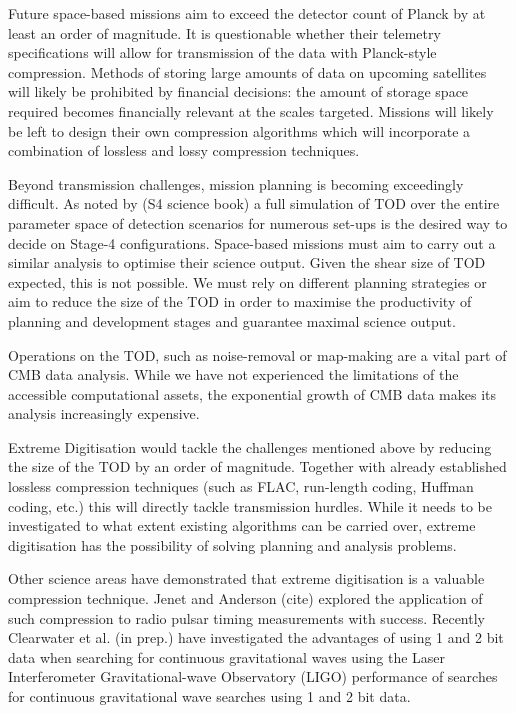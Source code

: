 \documentclass[apj]{emulateapj}
\begin{document}
Future space-based missions aim to exceed the detector count of Planck by at least an order of magnitude. It is questionable whether their telemetry specifications will allow for transmission of the data with Planck-style compression. Methods of storing large amounts of data on upcoming satellites will likely be prohibited by financial decisions: the amount of storage space required becomes financially relevant at the scales targeted. Missions will likely be left to design their own compression algorithms which will incorporate a combination of lossless and lossy compression techniques.


Beyond transmission challenges, mission planning is becoming exceedingly difficult. As noted by (S4 science book) a full simulation of TOD over the entire parameter space of detection scenarios for numerous set-ups is the desired way to decide on Stage-4 configurations. Space-based missions must aim to carry out a similar analysis to optimise their science output. Given the shear size of TOD expected, this is not possible. We must rely on different planning strategies or aim to reduce the size of the TOD in order to maximise the productivity of planning and development stages and guarantee maximal science output.


Operations on the TOD, such as noise-removal or map-making are a vital part of CMB data analysis. While we have not experienced the limitations of the accessible computational assets, the exponential growth of CMB data makes its analysis increasingly expensive. 


Extreme Digitisation would tackle the challenges mentioned above by reducing the size of the TOD by an order of magnitude. Together with already established lossless compression techniques (such as FLAC, run-length coding, Huffman coding, etc.) this will directly tackle transmission hurdles. While it needs to be investigated to what extent existing algorithms can be carried over, extreme digitisation has the possibility of solving planning and analysis problems.

Other science areas have demonstrated that extreme digitisation is a valuable compression technique. Jenet and Anderson (cite) explored the application of such compression to radio pulsar timing measurements with success. Recently Clearwater et al. (in prep.) have investigated the advantages of using 1 and 2 bit data when searching for continuous gravitational waves using the Laser Interferometer Gravitational-wave Observatory (LIGO) performance of searches for continuous gravitational wave searches using 1 and 2 bit data.
\end{document}
